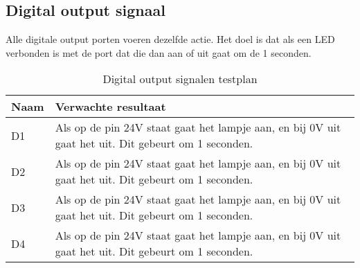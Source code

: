 \newpage
\subsection{Digital output signaal}
Alle digitale output porten voeren dezelfde actie. Het doel is dat als een LED verbonden is met de port dat die dan aan of uit gaat om de 1 seconden.
\begin{table}[h!]
	\caption{Digital output signalen testplan}
	\begin{tabular}{lp{14.5cm}}
	\toprule
	\textbf{Naam} 	& \textbf{Verwachte resultaat} \\ \toprule
	D1	&	Als op de pin 24V staat gaat het lampje aan, en bij 0V uit gaat het uit. Dit gebeurt om 1 seconden. \\			
	D2	&	Als op de pin 24V staat gaat het lampje aan, en bij 0V uit gaat het uit. Dit gebeurt om 1 seconden. \\			
	D3	&	Als op de pin 24V staat gaat het lampje aan, en bij 0V uit gaat het uit. Dit gebeurt om 1 seconden. \\			
	D4	&	Als op de pin 24V staat gaat het lampje aan, en bij 0V uit gaat het uit. Dit gebeurt om 1 seconden. \\ \bottomrule
	\end{tabular}
	\label{tab:hw_val_dio_testplan}
\end{table}

